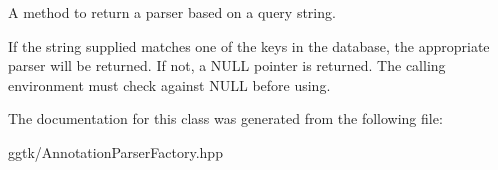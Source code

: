 A method to return a parser based on a query string. 

If the string supplied matches one of the keys in the database, the appropriate parser will be returned. If not, a N\+U\+LL pointer is returned. The calling environment must check against N\+U\+LL before using. 

The documentation for this class was generated from the following file\+:\begin{DoxyCompactItemize}
\item 
ggtk/Annotation\+Parser\+Factory.\+hpp\end{DoxyCompactItemize}
